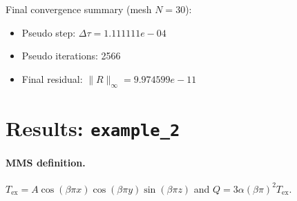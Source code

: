 \documentclass[11pt,a4paper]{article}
\begin{document}
\noindent Final convergence summary (mesh $N=30$):
\begin{itemize}
\item Pseudo step: $\Delta\tau=1.111111e-04$
\item Pseudo iterations: 2566
\item Final residual: $\|R\|_\infty=9.974599e-11$
\end{itemize}
\section{Results: \texttt{example\_2}}
\paragraph{MMS definition.}
$T_{\mathrm{ex}} = A\cos(\beta\pi x)\cos(\beta\pi y)\sin(\beta\pi z)$ and $Q = 3\alpha(\beta\pi)^2 T_{\mathrm{ex}}$.
\end{document}
